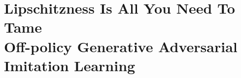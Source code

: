 

\chapter[%
Lipschitzness is all you need]{%
Lipschitzness Is All You Need To Tame \\
Off-policy Generative Adversarial Imitation Learning}
\label{thesis:chap2}



\clearpage
\begin{subappendices}

\end{subappendices}
